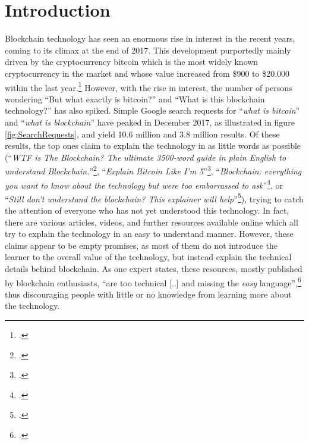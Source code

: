 \chapter{Introduction}
\label{chapter:Intro}

Blockchain technology has seen an enormous rise in interest in the recent years, coming to its climax at the end of 2017. This development purportedly mainly driven by the cryptocurrency bitcoin which is the most widely known cryptocurrency in the market and whose value increased from \$900 to \$20.000 within the last year.\footcite[Cf.][]{Higgins900200002017}
However, with the rise in interest, the number of persons wondering \enquote{But what exactly is bitcoin?} and \enquote{What is this blockchain technology?} has also spiked. Simple Google search requests for \enquote{\textit{what is bitcoin}} and \enquote{\textit{what is blockchain}} have peaked in December 2017, as illustrated in figure \ref{fig:SearchRequests}, and yield 10.6 million and 3.8 million results. Of these results, the top ones claim to explain the technology in as little words as possible (\enquote{\textit{WTF is The Blockchain?
The ultimate 3500-word guide in plain English to understand Blockchain.}}\footcite{MamoriaWTFBlockchain2017}, \enquote{\textit{Explain Bitcoin Like I'm 5}}\footcite{CustodioExplainBitcoinFive2013}, \enquote{\textit{Blockchain: everything you want to know about the technology but were too embarrassed to ask}}\footcite{HeathmannBlockchaineverythingyou2018}, or \enquote{\textit{Still don't understand the blockchain? This explainer will help}}\footcite{LeighSinodStilldonunderstand2018}), trying to catch the attention of everyone who has not yet understood this technology. In fact, there are various articles, videos, and further resources available online which all try to explain the technology in an easy to understand manner. However, these claims appear to be empty promises, as most of them do not introduce the learner to the overall value of the technology, but instead explain the technical details behind blockchain. As one expert states, these resources, mostly published by blockchain enthusiasts, \enquote{are too technical [..] and missing the \textit{easy} language},\footcite[Cf.][P19, P20]{DanielKaltenbach_Interview} thus discouraging people with little or no knowledge from learning more about the technology.

